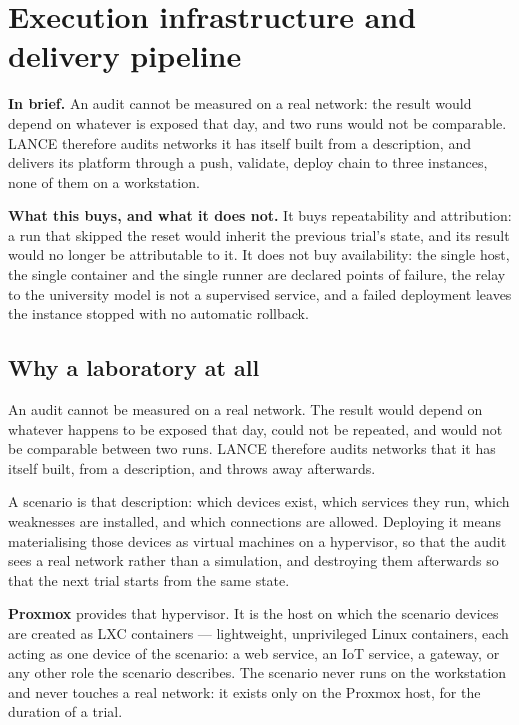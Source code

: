 \section{Execution infrastructure and delivery pipeline}
\label{sec:infrastructure}

\textbf{In brief.} An audit cannot be measured on a real network: the result would
depend on whatever is exposed that day, and two runs would not be comparable.
LANCE therefore audits networks it has itself built from a description, and
delivers its platform through a push, validate, deploy chain to three instances,
none of them on a workstation.

\textbf{What this buys, and what it does not.} It buys repeatability and
attribution: a run that skipped the reset would inherit the previous trial's state,
and its result would no longer be attributable to it. It does not buy availability:
the single host, the single container and the single runner are declared points of
failure, the relay to the university model is not a supervised service, and a
failed deployment leaves the instance stopped with no automatic rollback.

\subsection{Why a laboratory at all}
\label{sec:proxmox}

An audit cannot be measured on a real network. The result would depend on whatever
happens to be exposed that day, could not be repeated, and would not be
comparable between two runs. LANCE therefore audits networks that it has itself
built, from a description, and throws away afterwards.

A scenario is that description: which devices exist, which services they run,
which weaknesses are installed, and which connections are allowed. Deploying it
means materialising those devices as virtual machines on a hypervisor, so that the
audit sees a real network rather than a simulation, and destroying them afterwards
so that the next trial starts from the same state.

\textbf{Proxmox} provides that hypervisor. It is the host on which the scenario
devices are created as LXC containers --- lightweight, unprivileged Linux
containers, each acting as one device of the scenario: a web service, an IoT
service, a gateway, or any other role the scenario describes. The scenario never
runs on the workstation and never touches a real network: it exists only on the
Proxmox host, for the duration of a trial.

